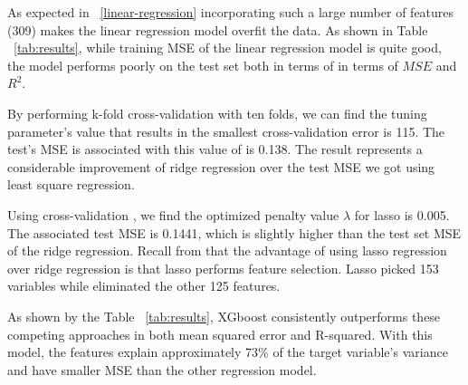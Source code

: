 As expected in ~\ref{linear-regression} incorporating such a large number
of features (309) makes the linear regression model overfit the data. As
shown in Table ~\ref{tab:results}, while training MSE of the linear regression
model is quite good, the model performs poorly on the test set both in terms of
in terms of $MSE$ and $R^2$.

By performing k-fold cross-validation with ten folds, we can find the tuning
parameter's value that results in the smallest cross-validation error is 115.
The test's MSE is associated with this value of  is 0.138.  The result
represents a considerable improvement of ridge regression over the test MSE we
got using least square regression.


Using cross-validation , we find the optimized penalty value $\lambda$ for lasso
is 0.005.  The associated test MSE is 0.1441, which is slightly higher than the
test set MSE of the ridge regression.  Recall from that the advantage of using
lasso regression over ridge regression is that lasso performs feature selection.
Lasso picked 153 variables while eliminated the other 125 features.


As shown by the Table ~\ref{tab:results}, XGboost consistently outperforms these
competing approaches in both mean squared error and R-squared.  With this model,
the features explain approximately 73\% of the target variable's variance and
have smaller MSE than the other regression model.

